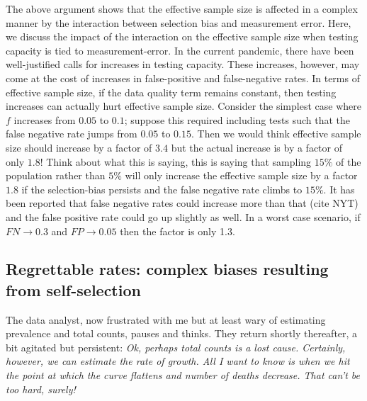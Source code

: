 \documentclass[11pt]{amsart}
\begin{document}
The above argument shows that the effective sample size is affected in a complex manner by the interaction between selection bias and measurement error.  Here, we discuss the impact of the interaction on the effective sample size when testing capacity is tied to measurement-error.  In the current pandemic, there have been well-justified calls for increases in testing capacity.  These increases, however, may come at the cost of increases in false-positive and false-negative rates.  In terms of effective sample size, if the data quality term remains constant, then testing increases can actually hurt effective sample size.  Consider the simplest case where $f$ increases from $0.05$ to $0.1$; suppose this required including tests such that the false negative rate jumps from $0.05$ to $0.15$.  Then we would think effective sample size should increase by a factor of $3.4$ but the actual increase is by a factor of only $1.8$!  Think about what this is saying, this is saying that sampling $15\%$ of the population rather than $5\%$ will only increase the effective sample size by a factor $1.8$ if the selection-bias persists and the false negative rate climbs to $15\%$.   It has been reported that false negative rates could increase more than that (cite NYT) and the false positive rate could go up slightly as well.  In a worst case scenario, if $FN \to 0.3$ and $FP \to 0.05$ then the factor is only 1.3.

\subsection{Regrettable rates: complex biases resulting from self-selection}
\label{section:rates}

The data analyst, now frustrated with me but at least wary of estimating prevalence and total counts, pauses and thinks.  They return shortly thereafter, a bit agitated but persistent: \emph{Ok, perhaps total counts is a lost cause. Certainly, however, we can estimate the rate of growth.  All I want to know is when we hit the point at which the curve flattens and number of deaths decrease.  That can't be too hard, surely!}
\end{document}
